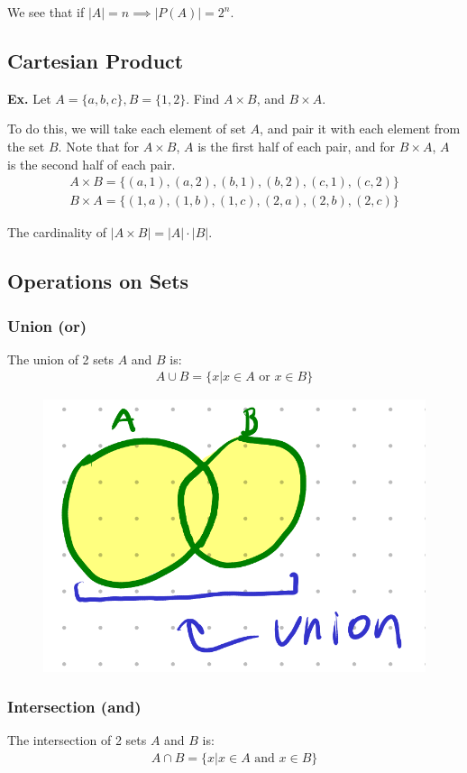\documentclass[12pt,letterpaper]{article} \usepackage{amsmath} \usepackage{graphicx}  \usepackage{longtable}  \usepackage{amssymb}
\begin{document}
        We see that if $|A| = n \implies |P(A)| = 2^n$.

        \subsection{Cartesian Product}
        \begin{mdframed}
            \textbf{Ex. } Let $A=\{a,b,c\}, B=\{1,2\}$. Find $A\times B$, and $B\times A$.

            To do this, we will take each element of set $A$, and pair it with each element from the set $B$. Note that for $A\times B$, $A$ is the first half of each pair, and for $B\times A$, $A$ is the second half of each pair. 
            \begin{align*}
                A\times B = \{(a,1), (a,2), (b,1), (b,2), (c,1), (c,2)\}\\
                B\times A = \{(1,a), (1,b), (1,c), (2,a), (2,b), (2,c)\}
            \end{align*}
        \end{mdframed}

        The cardinality of $|A\times B| = |A|\cdot |B|$.

        \subsection{Operations on Sets}

            \subsubsection{Union (or)}
            The union of 2 sets $A$ and $B$ is:
            \begin{align*}
                A\cup B = \{x | x\in A \text{ or } x\in B\}
            \end{align*}

            \begin{figure}[H]
                \centering
                \includegraphics[width=0.3\linewidth]{union.png}
            \end{figure}
            
            \subsubsection{Intersection (and)}
            The intersection of 2 sets $A$ and $B$ is:
            \begin{align*}
                A\cap B = \{x | x\in A \text{ and } x \in B\}
            \end{align*}
\end{document}
